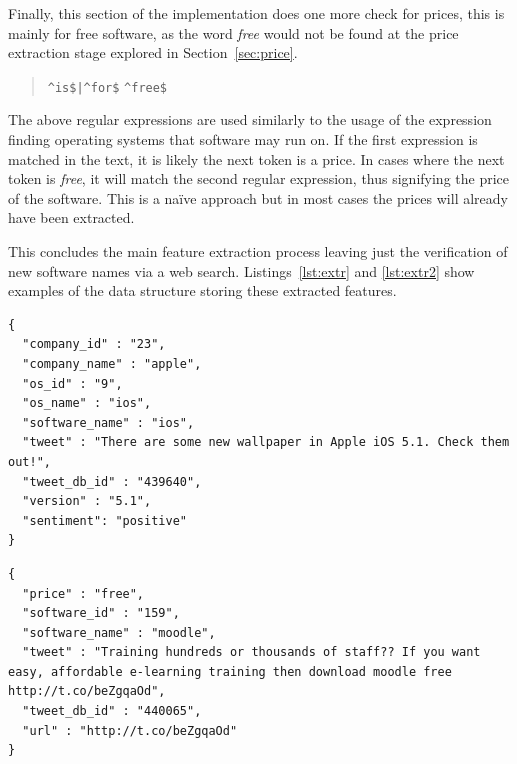 Finally, this section of the implementation does one more check for prices, this is mainly for free software, as the word \emph{free} would not be found at the price extraction stage explored in Section~\ref{sec:price}. 
\begin{quote}
\verb~^is$|^for$~
\newline
\verb~^free$~
\end{quote}

The above regular expressions are used similarly to the usage of the expression finding operating systems that software may run on. If the first expression is matched in the text, it is likely the next token is a price. In cases where the next token is \emph{free}, it will match the second regular expression, thus signifying the price of the software. This is a na\"{i}ve approach but in most cases the prices will already have been extracted.

This concludes the main feature extraction process leaving just the verification of new software names via a web search. Listings~\ref{lst:extr} and \ref{lst:extr2} show examples of the data structure storing these extracted features.

\begin{lstlisting}[caption=Example of some extracted features, label=lst:extr]
{
  "company_id" : "23",
  "company_name" : "apple",
  "os_id" : "9",
  "os_name" : "ios",
  "software_name" : "ios",
  "tweet" : "There are some new wallpaper in Apple iOS 5.1. Check them out!",
  "tweet_db_id" : "439640",
  "version" : "5.1",
  "sentiment": "positive"
}
\end{lstlisting}

\begin{lstlisting}[caption=Another example of some extracted features, label=lst:extr2]
{
  "price" : "free",
  "software_id" : "159",
  "software_name" : "moodle",
  "tweet" : "Training hundreds or thousands of staff?? If you want easy, affordable e-learning training then download moodle free http://t.co/beZgqaOd",
  "tweet_db_id" : "440065",
  "url" : "http://t.co/beZgqaOd"
}
\end{lstlisting}

